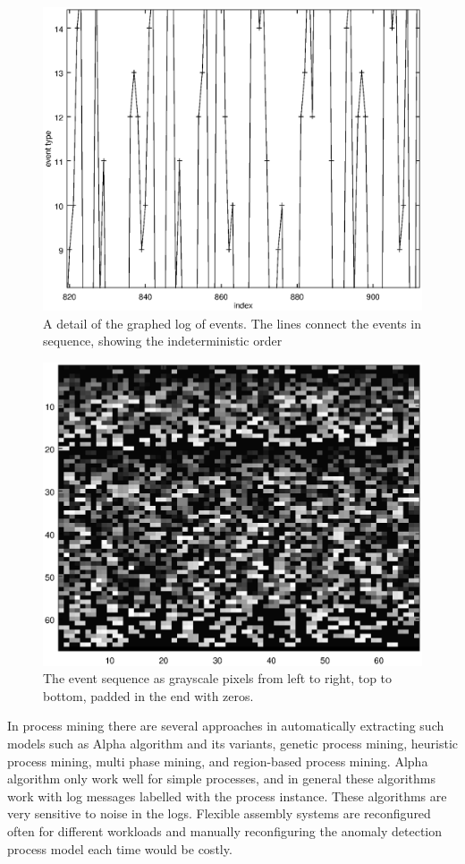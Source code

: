 \documentclass[journal]{IEEEtran}
\begin{document}
\begin{figure}[tb]
 \centering
 \includegraphics[width=8 cm,keepaspectratio=true]{./detail.eps}
 \caption{A detail of the graphed log of events. The lines connect the events in sequence, showing the indeterministic order}
 \label{figure:zoomed_events}
\end{figure}

\begin{figure}[tb]
 \centering
 \includegraphics[width=8 cm,keepaspectratio=true]{./color_vis.eps}
 \caption{The event sequence as grayscale pixels from left to right, top to bottom, padded in the end with zeros.}
 \label{figure:color_vis}
\end{figure}

In process mining there are several approaches in automatically extracting such models such as Alpha algorithm and its 
variants, genetic process mining, heuristic process mining, multi phase mining, and region-based process mining. Alpha algorithm only work well for simple processes,
and in general these algorithms work with log messages labelled with the process instance. These algorithms are very sensitive to noise in the logs.
Flexible assembly systems are reconfigured often for different workloads and manually reconfiguring the anomaly
detection process model each time would be costly.
\end{document}
